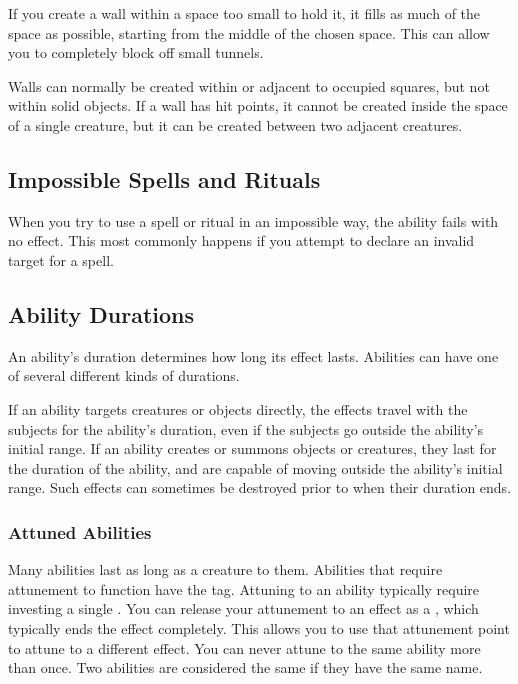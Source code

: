     If you create a wall within a space too small to hold it, it fills as much of the space as possible, starting from the middle of the chosen space.
    This can allow you to completely block off small tunnels.

    Walls can normally be created within or adjacent to occupied squares, but not within solid objects.
    If a wall has hit points, it cannot be created inside the space of a single creature, but it can be created between two adjacent creatures.

  \subsection{Impossible Spells and Rituals}
    When you try to use a spell or ritual in an impossible way, the ability fails with no effect.
    This most commonly happens if you attempt to declare an invalid target for a spell.

  \subsection{Ability Durations}\label{Ability Durations}

    An ability's duration determines how long its effect lasts.
    Abilities can have one of several different kinds of durations.

    If an ability targets creatures or objects directly, the effects travel with the subjects for the ability's duration, even if the subjects go outside the ability's initial range.
    If an ability creates or summons objects or creatures, they last for the duration of the ability, and are capable of moving outside the ability's initial range.
    Such effects can sometimes be destroyed prior to when their duration ends.

    \subsubsection{Attuned Abilities}\label{Attuned Abilities}
      Many abilities last as long as a creature  to them.
      Abilities that require attunement to function have the  tag.
      Attuning to an ability typically require investing a single .
      You can release your attunement to an effect as a , which typically ends the effect completely.
      This allows you to use that attunement point to attune to a different effect.
      You can never attune to the same ability more than once.
      Two abilities are considered the same if they have the same name.

